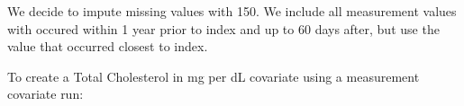 \documentclass[
]{article}
\newenvironment{Shaded}{\begin{snugshade}}{\end{snugshade}}
\newcommand{\ControlFlowTok}[1]{\textcolor[rgb]{0.13,0.29,0.53}{\textbf{#1}}}
\newcommand{\DataTypeTok}[1]{\textcolor[rgb]{0.13,0.29,0.53}{#1}}
\newcommand{\DecValTok}[1]{\textcolor[rgb]{0.00,0.00,0.81}{#1}}
\newcommand{\FloatTok}[1]{\textcolor[rgb]{0.00,0.00,0.81}{#1}}
\newcommand{\KeywordTok}[1]{\textcolor[rgb]{0.13,0.29,0.53}{\textbf{#1}}}
\newcommand{\NormalTok}[1]{#1}
\newcommand{\OperatorTok}[1]{\textcolor[rgb]{0.81,0.36,0.00}{\textbf{#1}}}
\newcommand{\OtherTok}[1]{\textcolor[rgb]{0.56,0.35,0.01}{#1}}
\newcommand{\StringTok}[1]{\textcolor[rgb]{0.31,0.60,0.02}{#1}}
\begin{document}
\begin{Shaded}
\end{Shaded}

We decide to impute missing values with 150. We include all measurement
values with occured within 1 year prior to index and up to 60 days
after, but use the value that occurred closest to index.

To create a Total Cholesterol in mg per dL covariate using a measurement
covariate run:
\end{document}
